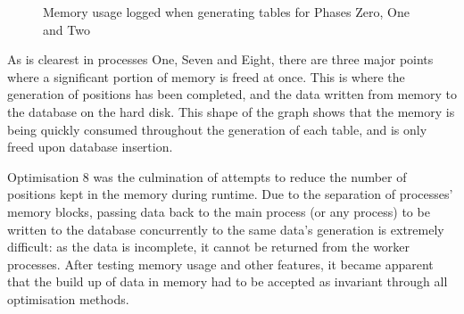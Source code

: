 \documentclass{report}
\begin{document}
    \begin{figure}[H]
    	\caption{Memory usage logged when generating tables for Phases Zero, One and Two}
    	\label{fig:memoryLoggerGraph}
    \end{figure}
    
    As is clearest in processes One, Seven and Eight, there are three major points where a significant portion of memory is freed at once. This is where the generation of positions has been completed, and the data written from memory to the database on the hard disk. This shape of the graph shows that the memory is being quickly consumed throughout the generation of each table, and is only freed upon database insertion.
    
    Optimisation 8 was the culmination of attempts to reduce the number of positions kept in the memory during runtime. Due to the separation of processes' memory blocks, passing data back to the main process (or any process) to be written to the database concurrently to the same data's generation is extremely difficult: as the data is incomplete, it cannot be returned from the worker processes. After testing memory usage and other features, it became apparent that the build up of data in memory had to be accepted as invariant through all optimisation methods.
    
\end{document}
